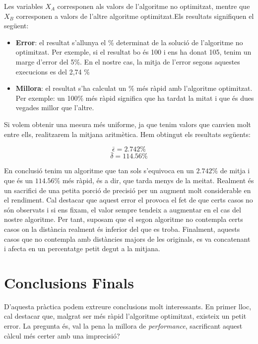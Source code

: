 \documentclass[conference]{IEEEtran}
\begin{document}
    Les variables $X_A$ corresponen als valors de l'algoritme no optimitzat, mentre que $X_B$ corresponen a valors de l'altre algoritme optimitzat.Els resultats signifiquen el següent:\\

    \begin{itemize}
        \item \textbf{Error}: el resultat s'allunya el \% determinat de la solució de l'algoritme no optimitzat. Per exemple, si el resultat bo és 100 i ens ha donat 105, tenim un marge d'error del 5\%. En el nostre cas, la mitja de l'error segons aquestes execucions es del 2,74 \%

        \item \textbf{Millora}: el resultat s'ha calculat un \% més ràpid amb l'algoritme optimitzat. Per exemple: un 100\% més ràpid significa que ha tardat la mitat i que és dues vegades millor que l'altre.
        
    \end{itemize}

    Si volem obtenir una mesura més uniforme, ja que tenim valors que canvien molt entre ells, realitzarem la mitjana aritmètica. Hem obtingut els resultats següents:

    $$\bar{\epsilon}=2.742\%$$
    $$\bar{\delta}=114.56\%$$

    En conclusió tenim un algoritme que tan sols s'equivoca en un $2.742\%$ de mitja i que és un $114.56\%$ més ràpid, és a dir, que tarda menys de la meitat. Realment és un sacrifici de una petita porció de precisió per un augment molt considerable en el rendiment. Cal destacar que aquest error el provoca el fet de que certs casos no són observats i si ens fixam, el valor sempre tendeix a augmentar en el cas del nostre algoritme. Per tant, suposam que el segon algoritme no contempla certs casos on la distància realment és inferior del que es troba. Finalment, aquests casos que no contempla amb distàncies majors de les originals, es va concatenant i afecta en un percentatge petit degut a la mitjana.
    



\section{Conclusions Finals}
    D'aquesta pràctica podem extreure conclusions molt interessants. En primer lloc, cal destacar que, malgrat ser més ràpid l'algoritme optimitzat, existeix un petit error. La pregunta és, val la pena la millora de \textit{performance}, sacrificant aquest càlcul més certer amb una imprecisió?\\\\
\end{document}
